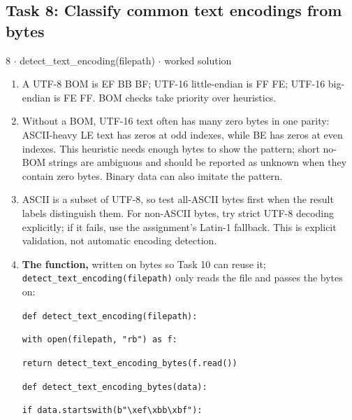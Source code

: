 \documentclass[11pt]{article}
\begin{document}
\begin{keepsection}\subsection{Task 8: Classify common text encodings from bytes}

\begin{workedbox}{8 \ensuremath{\cdot} detect\_text\_encoding(filepath) \ensuremath{\cdot} worked solution}
\begin{enumerate}
\item A UTF-8 BOM is EF BB BF; UTF-16 little-endian is FF FE; UTF-16 big-endian is FE FF. BOM checks take priority over heuristics.
\item Without a BOM, UTF-16 text often has many zero bytes in one parity: ASCII-heavy LE text has zeros at odd indexes, while BE has zeros at even indexes. This heuristic needs enough bytes to show the pattern; short no-BOM strings are ambiguous and should be reported as unknown when they contain zero bytes. Binary data can also imitate the pattern.
\item ASCII is a subset of UTF-8, so test all-ASCII bytes first when the result labels distinguish them. For non-ASCII bytes, try strict UTF-8 decoding explicitly; if it fails, use the assignment’s Latin-1 fallback. This is explicit validation, not automatic encoding detection.
\item {}
\textbf{The function,} written on bytes so Task 10 can reuse it; \texttt{detect\_text\_encoding(filepath)} only reads the file and passes the bytes on:
\begin{tcolorbox}[colback=Paperblue,colframe=Paperblue,boxrule=0pt,arc=0pt,left=7pt,right=7pt,top=5pt,bottom=5pt]\small\sloppy
\noindent\hspace*{0em}\texttt{def detect\_text\_encoding(filepath):}\par
\noindent\hspace*{1em}\texttt{with open(filepath, "rb") as f:}\par
\noindent\hspace*{3em}\texttt{return detect\_text\_encoding\_bytes(f.read())}\par
\noindent\hspace*{0em}\texttt{}\par
\noindent\hspace*{0em}\texttt{def detect\_text\_encoding\_bytes(data):}\par
\noindent\hspace*{1em}\texttt{if data.startswith(b"\textbackslash{}xef\textbackslash{}xbb\textbackslash{}xbf"):}\par

\end{tcolorbox}
\end{enumerate}
\end{workedbox}
\end{keepsection}
\end{document}
